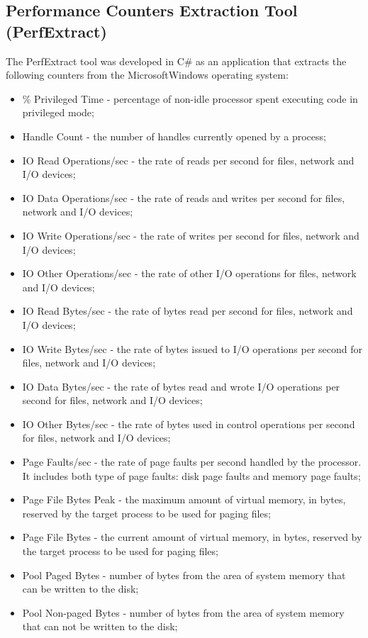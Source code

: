 \documentclass[conference]{IEEEtran}
\begin{document}
\subsection{Performance Counters Extraction Tool (PerfExtract)}\label{sub:PCET}
The PerfExtract tool was developed in C\# as an application that extracts the following counters 
from the Microsoft\texttrademark Windows operating system:
\begin{itemize}
\item \% Privileged Time - percentage of non-idle processor spent executing code in privileged mode;
\item Handle Count - the number of handles currently opened by a process;
\item IO Read Operations/sec - the rate of reads per second for files, network and I/O devices;
\item IO Data Operations/sec - the rate of reads and writes per second for files, network and I/O 
devices;
\item IO Write Operations/sec - the rate of writes per second for files, network and I/O devices;
\item IO Other Operations/sec - the rate of other I/O operations for files, network and I/O devices;
\item IO Read Bytes/sec - the rate of bytes read per second for files, network and I/O devices; 
\item IO Write Bytes/sec - the rate of bytes issued to I/O operations per second for files, network 
and I/O devices;
\item IO Data Bytes/sec - the rate of bytes read and wrote I/O operations per second for files, network and I/O devices;
\item IO Other Bytes/sec - the rate of bytes used in control operations per second for files, network and I/O devices;
\item Page Faults/sec - the rate of page faults per second handled by the processor. It includes both type of page faults: disk page faults and memory page faults;
\item Page File Bytes Peak -  the maximum amount of virtual memory, in bytes, reserved by the target process to be used for paging files; 
\item Page File Bytes - the current amount of virtual memory, in bytes, reserved by the target process to be used for paging files; 
\item Pool Paged Bytes - number of bytes from the area of system memory that can be written to the disk;
\item Pool Non-paged Bytes - number of bytes from the area of system memory that can not be written to the disk;

\end{itemize}
\end{document}
